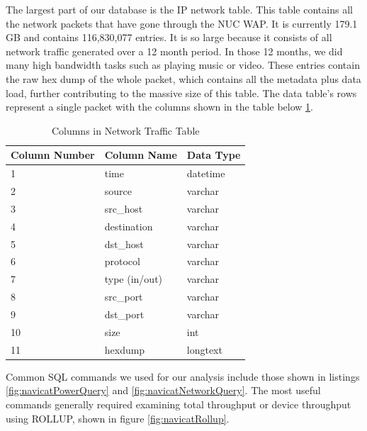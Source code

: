 The largest part of our database is the IP network table. This table contains all the network packets that have gone through the NUC WAP. It is currently 179.1 GB and contains 116,830,077 entries. It is so large because it consists of all network traffic generated over a 12 month period. In those 12 months, we did many high bandwidth tasks such as playing music or video. These entries contain the raw hex dump of the whole packet, which contains all the metadata plus data load, further contributing to the massive size of this table. The data table's rows represent a single packet with the columns shown in the table below \ref{tab:netcol}.

\begin{table}[H]
    \centering
    \caption{Columns in Network Traffic Table}
    \begin{tabular}{@{}lll@{}}
    \toprule
    Column Number & Column Name & Data Type \\ \midrule
    1             & time        & datetime  \\
    2             & source      & varchar   \\
    3             & src\_host   & varchar   \\
    4             & destination & varchar   \\
    5             & dst\_host   & varchar   \\
    6             & protocol    & varchar   \\
    7             & type (in/out)       & varchar   \\
    8             & src\_port   & varchar   \\
    9             & dst\_port   & varchar   \\
    10            & size        & int       \\
    11            & hexdump     & longtext  \\ \bottomrule
    \end{tabular}
    \label{tab:netcol}
    \end{table}

Common SQL commands we used for our analysis include those shown in listings \ref{fig:navicatPowerQuery} and \ref{fig:navicatNetworkQuery}. The most useful commands generally required examining total throughput or device throughput using ROLLUP, shown in figure \ref{fig:navicatRollup}.

